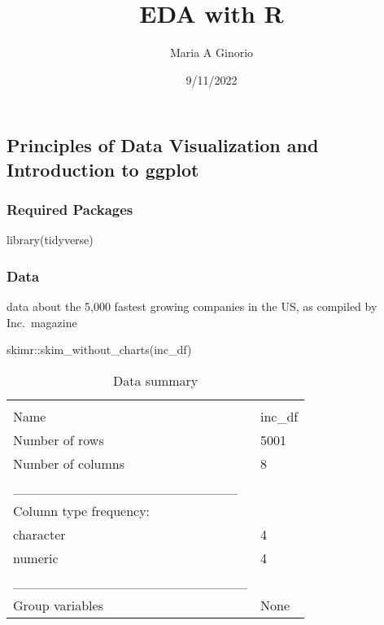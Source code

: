 \documentclass[
]{article}
\title{EDA with R}
\author{Maria A Ginorio}
\date{9/11/2022}
\newenvironment{Shaded}{\begin{snugshade}}{\end{snugshade}}
\newcommand{\FunctionTok}[1]{\textcolor[rgb]{0.00,0.00,0.00}{#1}}
\newcommand{\NormalTok}[1]{#1}
\newcommand{\SpecialCharTok}[1]{\textcolor[rgb]{0.00,0.00,0.00}{#1}}
\begin{document}
\maketitle

\hypertarget{principles-of-data-visualization-and-introduction-to-ggplot}{%
\subsection{\texorpdfstring{\textbf{Principles of Data Visualization and
Introduction to
ggplot}}{Principles of Data Visualization and Introduction to ggplot}}\label{principles-of-data-visualization-and-introduction-to-ggplot}}

\hypertarget{required-packages}{%
\subsubsection{Required Packages}\label{required-packages}}

\begin{Shaded}
\begin{Highlighting}[]
\FunctionTok{library}\NormalTok{(tidyverse)}
\end{Highlighting}
\end{Shaded}

\hypertarget{data}{%
\subsubsection{Data}\label{data}}

data about the 5,000 fastest growing companies in the US, as compiled by
Inc.~magazine

\begin{Shaded}
\begin{Highlighting}[]
\NormalTok{skimr}\SpecialCharTok{::}\FunctionTok{skim\_without\_charts}\NormalTok{(inc\_df)}
\end{Highlighting}
\end{Shaded}

\begin{longtable}[]{@{}ll@{}}
\caption{Data summary}\tabularnewline
\toprule
& \\
\midrule
\endfirsthead
\toprule
& \\
\midrule
\endhead
Name & inc\_df \\
Number of rows & 5001 \\
Number of columns & 8 \\
\_\_\_\_\_\_\_\_\_\_\_\_\_\_\_\_\_\_\_\_\_\_\_ & \\
Column type frequency: & \\
character & 4 \\
numeric & 4 \\
\_\_\_\_\_\_\_\_\_\_\_\_\_\_\_\_\_\_\_\_\_\_\_\_ & \\
Group variables & None \\
\bottomrule
\end{longtable}
\end{document}
